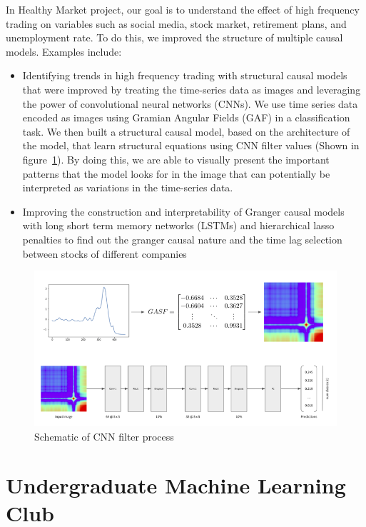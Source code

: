 In Healthy Market project, our goal is to understand the effect of high frequency trading on variables such as social media, stock market, retirement plans, and unemployment rate. To do this, we improved the structure of multiple causal models. Examples include: 
\begin{itemize}
\item Identifying trends in high frequency trading with structural causal models that were improved by treating the time-series data as images and leveraging the power of convolutional neural networks (CNNs). We use time series data encoded as images using Gramian Angular Fields (GAF) in a classification task. We then built a structural causal model, based on the architecture of the model, that learn structural equations using CNN filter values (Shown in figure~\ref{fig:hm}). By doing this, we are able to visually present the important patterns that the model looks for in the image that can potentially be interpreted as variations in the time-series data.
\item Improving the construction and interpretability of Granger causal models with long short term memory networks (LSTMs) and hierarchical lasso penalties to find out the granger causal nature and the time lag selection between stocks of different companies 
\end{itemize}

\pagebreak
\begin{figure}[!hbtp]
\includegraphics[width=\textwidth]{images/hm}
\caption[Healthy Markets CNN filter schematic]{Schematic of CNN filter process}
\label{fig:hm}
\end{figure}

\pagebreak
\section{Undergraduate Machine Learning Club}
\label{sec:mlc}

